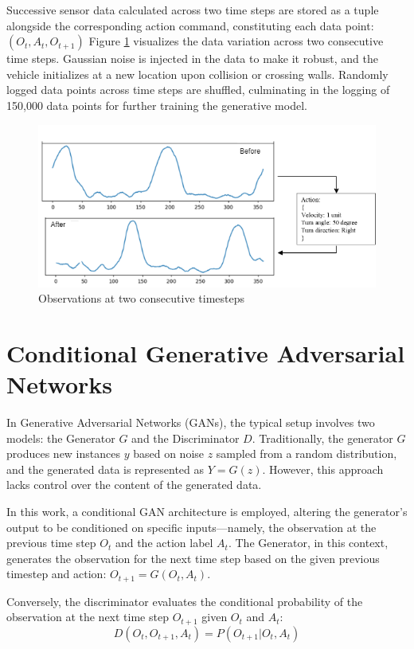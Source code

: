 \documentclass[12pt,twoside,a4paper,parskip]{scrbook} %
\begin{document}
Successive sensor data calculated across two time steps are stored as a tuple alongside the corresponding action command, constituting each data point: \((O_t, A_t, O_{t+1})\)
Figure \ref{fig:befaft} visualizes the data variation across two consecutive time steps. Gaussian noise is injected in the data to make it robust, and the vehicle initializes at a new location upon collision or crossing walls. Randomly logged data points across time steps are shuffled, culminating in the logging of 150,000 data points for further training the generative model.
\begin{figure}[h]
    \centering
    \includegraphics[width=1\textwidth]{Images/before after.png}
    \caption{Observations at two consecutive timesteps}
    \label{fig:befaft}
  \end{figure}

\section{Conditional Generative Adversarial Networks}
In Generative Adversarial Networks (GANs), the typical setup involves two models: the Generator \(G\) and the Discriminator \(D\). Traditionally, the generator \(G\) produces new instances \(y\) based on noise \(z\) sampled from a random distribution, and the generated data is represented as \(Y = G(z)\). However, this approach lacks control over the content of the generated data.

In this work, a conditional GAN architecture is employed, altering the generator's output to be conditioned on specific inputs—namely, the observation at the previous time step \(O_t\) and the action label \(A_t\). The Generator, in this context, generates the observation for the next time step based on the given previous timestep and action: \(O_{t+1} = G(O_t, A_t)\).

Conversely, the discriminator evaluates the conditional probability of the observation at the next time step \(O_{t+1}\) given \(O_t\) and \(A_t\):
\[D(O_t, O_{t+1}, A_t) = P(O_{t+1} | O_t, A_t)\]
\end{document}
